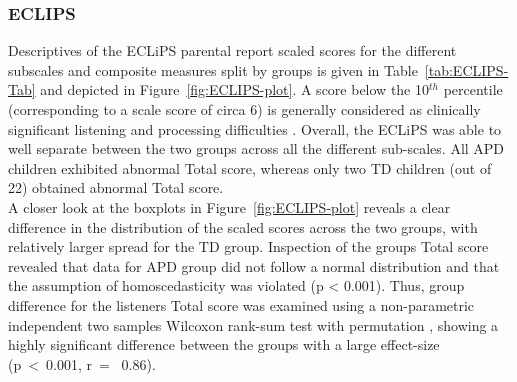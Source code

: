 \documentclass[a4paper, twoside]{templates/ociamthesis}
\begin{document}
\hypertarget{eclips}{%
\subsubsection{ECLIPS}\label{eclips}}

Descriptives of the ECLiPS parental report scaled scores for the different subscales and composite measures split by groups is given in Table~\ref{tab:ECLIPS-Tab} and depicted in Figure~\ref{fig:ECLIPS-plot}. A score below the 10\(^{th}\) percentile (corresponding to a scale score of circa 6) is generally considered as clinically significant listening and processing difficulties \autocite{Barry2014}. Overall, the ECLiPS was able to well separate between the two groups across all the different sub-scales. All APD children exhibited abnormal Total score, whereas only two TD children (out of 22) obtained abnormal Total score.\\

A closer look at the boxplots in Figure~\ref{fig:ECLIPS-plot} reveals a clear difference in the distribution of the scaled scores across the two groups, with relatively larger spread for the TD group. Inspection of the groups Total score revealed that data for APD group did not follow a normal distribution and that the assumption of homoscedasticity was violated (p \textless{} 0.001). Thus, group difference for the listeners Total score was examined using a non-parametric independent two samples Wilcoxon rank-sum test with permutation \autocite[N=999999, \emph{coin::wilcox\_test()};][]{CoinPackageR}, showing a highly significant difference between the groups with a large effect-size (p~\textless~0.001, r~= ~0.86).\\
\end{document}
